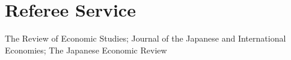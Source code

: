 \documentclass[11pt]{article}
\begin{document}
\section{Referee Service}

The Review of Economic Studies; Journal of the Japanese and International
Economies; The Japanese Economic Review
\end{document}

